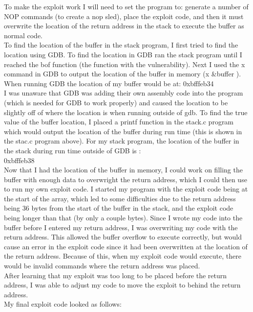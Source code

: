 \documentclass[14pt]{extarticle}
\begin{document}
To make the exploit work I will need to set the program to: generate a number of NOP commands (to create a nop sled), place the exploit code, and then it must overwrite the location of the return address in the stack to execute the buffer as normal code. \\
To find the location of the buffer in the stack program, I first tried to find the location using GDB. To find the location in GDB ran the stack program until I reached the bof function (the function with the vulnerability). Next I used the x command in GDB to output the location of the buffer in memory (x \&buffer ). When running GDB the location of my buffer would be at:
0xbfffeb34\\
I was unaware that GDB was adding their own assembly code into the program (which is needed for GDB to work properly) and caused the location to be slightly off of where the location is when running outside of gdb. To find the true value of the buffer location, I placed a printf function in the stack.c program which would output the location of the buffer during run time (this is shown in the stac.c program above).
For my stack program, the location of the buffer in the stack during run time outside of GDB is :\\
0xbfffeb38\\
Now that I had the location of the buffer in memory, I could work on filling the buffer with enough data to overwright the return address, which I could then use to run my own exploit code.
I started my program with the exploit code being at the start of the array, which led to some difficulties due to the return address being 36 bytes from the start of the buffer in the stack, and the exploit code being longer than that (by only a couple bytes). Since I wrote my code into the buffer before I entered my return address, I was overwriting my code with the return address. This allowed the buffer overflow to execute correctly, but would cause an error in the exploit code since it had been overwritten at the location of the return address. Because of this, when my exploit code would execute, there would be invalid commands where the return address was placed.\\
After learning that my exploit was too long to be placed before the return address, I was able to adjust my code to move the exploit to behind the return address.\\
My final exploit code looked as follows:\\
\end{document}
